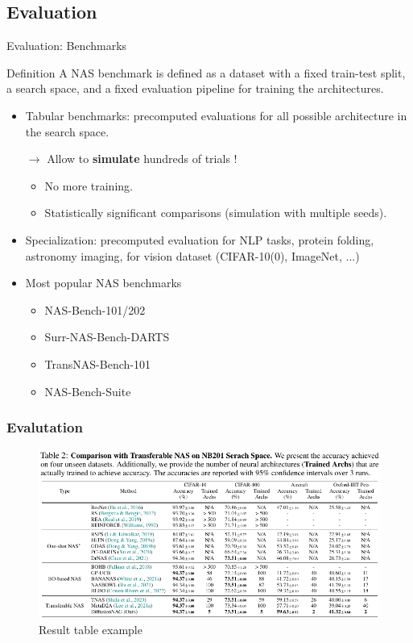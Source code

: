 \documentclass[aspectratio=169,xcolor=dvipsnames]{beamer}
\begin{document}
\subsection{Evaluation}
\begin{frame}{Evaluation: Benchmarks}
    \begin{block}{Definition}
        A NAS benchmark is defined as a dataset with a fixed train-test split, a search space, and a fixed evaluation pipeline for training the architectures.
    \end{block}
    \begin{itemize}
        \item Tabular benchmarks: precomputed evaluations for all possible architecture in the search space.
        \item [$\rightarrow$] Allow to \textbf{simulate} hundreds of trials !\begin{itemize}
                  \item No more training.
                  \item Statistically significant comparisons (simulation with multiple seeds).
              \end{itemize}
        \item Specialization: precomputed evaluation for NLP tasks, protein folding, astronomy imaging, for vision dataset (CIFAR-10(0), ImageNet, ...)
        \item Most popular NAS benchmarks \begin{itemize}
                  \item NAS-Bench-101/202
                  \item Surr-NAS-Bench-DARTS
                  \item TransNAS-Bench-101
                  \item NAS-Bench-Suite
              \end{itemize}
    \end{itemize}
\end{frame}
\begin{frame}
    \frametitle{Evalutation}
    \begin{figure}[htbp]
        \centering
        \includegraphics[height=.7\textheight]{table_diffusionNAG.pdf}
        \caption{Result table example}
    \end{figure}
\end{frame}
\end{document}
